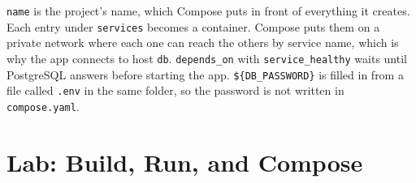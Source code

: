 \texttt{name} is the project's name, which Compose puts in front of everything it creates. Each entry under \texttt{services} becomes a container. Compose puts them on a private network where each one can reach the others by service name, which is why the app connects to host \texttt{db}. \texttt{depends\_on} with \texttt{service\_healthy} waits until PostgreSQL answers before starting the app. \texttt{\$\{DB\_PASSWORD\}} is filled in from a file called \texttt{.env} in the same folder, so the password is not written in \texttt{compose.yaml}.

\section{Lab: Build, Run, and Compose}\label{05-docker-in-practice:lab-build-run-and-compose}

